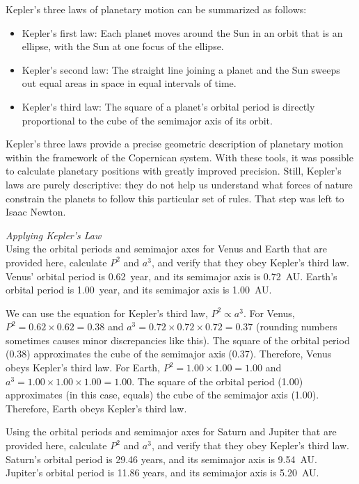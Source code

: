 \documentclass[../../main-astronomy.tex]{subfiles}
\begin{document}
Kepler's three laws of planetary motion can be summarized as follows:

\begin{itemize}
    \item \gls{Kepler's first law}: Each planet moves around the Sun in an orbit that is an ellipse, with the Sun at one focus of the ellipse.
    \item \gls{Kepler's second law}: The straight line joining a planet and the Sun sweeps out equal areas in space in equal intervals of time.
    \item \gls{Kepler's third law}: The square of a planet's orbital period is directly proportional to the cube of the semimajor axis of its orbit.
\end{itemize}

Kepler's three laws provide a precise geometric description of planetary motion within the framework of the Copernican system. With these tools, it was possible to calculate planetary positions with greatly improved precision. Still, Kepler's laws are purely descriptive: they do not help us understand what forces of nature constrain the planets to follow this particular set of rules. That step was left to Isaac Newton.

\begin{example}
    \textit{Applying Kepler's Law}\\
    Using the orbital periods and semimajor axes for Venus and Earth that are provided here, calculate $P^2$ and $a^3$, and verify that they obey Kepler's third law. Venus' orbital period is \SI{0.62}{year}, and its semimajor axis is \SI{0.72}{AU}. Earth's orbital period is \SI{1.00}{year}, and its semimajor axis is \SI{1.00}{AU}.
\end{example}

\Solution We can use the equation for Kepler’s third law, $P^2 \propto a^3$. For Venus, $P^2= 0.62 \times 0.62 = 0.38$ and $a^3 = 0.72 \times 0.72 \times 0.72 =0.37$ (rounding numbers sometimes causes minor discrepancies like this). The square of the orbital period (0.38) approximates the cube of the semimajor axis (0.37). Therefore, Venus obeys Kepler's third law. For Earth,  $P^2= 1.00 \times 1.00 = 1.00$ and $a^3 = 1.00 \times 1.00 \times 1.00 = 1.00$. The square of the orbital period (1.00) approximates (in this case, equals) the cube of the semimajor axis (1.00). Therefore, Earth obeys Kepler's third law.

\endsolution

\begin{cfu}
    Using the orbital periods and semimajor axes for Saturn and Jupiter that are provided here, calculate $P^2$ and $a^3$, and verify that they obey Kepler's third law. Saturn's orbital period is 29.46 years, and its semimajor axis is \SI{9.54}{AU}. Jupiter's orbital period is 11.86 years, and its semimajor axis is \SI{5.20}{AU}.
\end{cfu}
\end{document}
